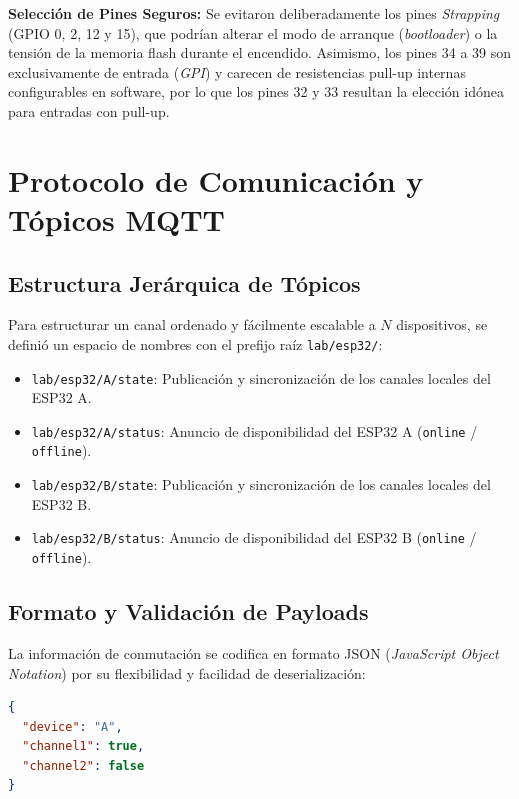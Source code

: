 \documentclass[11pt,a4paper]{article}
\begin{document}
\begin{infobox}
    \textbf{Selección de Pines Seguros:} Se evitaron deliberadamente los pines \textit{Strapping} (GPIO 0, 2, 12 y 15), que podrían alterar el modo de arranque (\textit{bootloader}) o la tensión de la memoria flash durante el encendido. Asimismo, los pines 34 a 39 son exclusivamente de entrada (\textit{GPI}) y carecen de resistencias pull-up internas configurables en software, por lo que los pines 32 y 33 resultan la elección idónea para entradas con pull-up.
\end{infobox}

\section{Protocolo de Comunicación y Tópicos MQTT}

\subsection{Estructura Jerárquica de Tópicos}
Para estructurar un canal ordenado y fácilmente escalable a $N$ dispositivos, se definió un espacio de nombres con el prefijo raíz \texttt{lab/esp32/}:
\begin{itemize}
    \item \texttt{lab/esp32/A/state}: Publicación y sincronización de los canales locales del ESP32 A.
    \item \texttt{lab/esp32/A/status}: Anuncio de disponibilidad del ESP32 A (\texttt{online} / \texttt{offline}).
    \item \texttt{lab/esp32/B/state}: Publicación y sincronización de los canales locales del ESP32 B.
    \item \texttt{lab/esp32/B/status}: Anuncio de disponibilidad del ESP32 B (\texttt{online} / \texttt{offline}).
\end{itemize}

\subsection{Formato y Validación de Payloads}
La información de conmutación se codifica en formato JSON (\textit{JavaScript Object Notation}) por su flexibilidad y facilidad de deserialización:
\begin{lstlisting}[language=json, caption={Payload publicado en el tópico \texttt{lab/esp32/A/state}}]
{
  "device": "A",
  "channel1": true,
  "channel2": false
}
\end{lstlisting}
\end{document}
